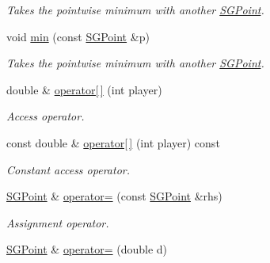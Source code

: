 \begin{DoxyCompactItemize}
\begin{DoxyCompactList}\small\item\em Takes the pointwise minimum with another \hyperlink{classSGPoint}{S\-G\-Point}. \end{DoxyCompactList}\item 
\hypertarget{classSGPoint_a06309da77645ba91101f4dedd20bd888}{void \hyperlink{classSGPoint_a06309da77645ba91101f4dedd20bd888}{min} (const \hyperlink{classSGPoint}{S\-G\-Point} \&p)}\label{classSGPoint_a06309da77645ba91101f4dedd20bd888}

\begin{DoxyCompactList}\small\item\em Takes the pointwise minimum with another \hyperlink{classSGPoint}{S\-G\-Point}. \end{DoxyCompactList}\item 
\hypertarget{classSGPoint_a640f67ad5fa6d0b5814b7c9aecd259d3}{double \& \hyperlink{classSGPoint_a640f67ad5fa6d0b5814b7c9aecd259d3}{operator\mbox{[}$\,$\mbox{]}} (int player)}\label{classSGPoint_a640f67ad5fa6d0b5814b7c9aecd259d3}

\begin{DoxyCompactList}\small\item\em Access operator. \end{DoxyCompactList}\item 
\hypertarget{classSGPoint_a23c4b005c8bc8968a806ee0458f94f9a}{const double \& \hyperlink{classSGPoint_a23c4b005c8bc8968a806ee0458f94f9a}{operator\mbox{[}$\,$\mbox{]}} (int player) const }\label{classSGPoint_a23c4b005c8bc8968a806ee0458f94f9a}

\begin{DoxyCompactList}\small\item\em Constant access operator. \end{DoxyCompactList}\item 
\hypertarget{classSGPoint_aedf45913c65b31cf7363f428cbe17087}{\hyperlink{classSGPoint}{S\-G\-Point} \& \hyperlink{classSGPoint_aedf45913c65b31cf7363f428cbe17087}{operator=} (const \hyperlink{classSGPoint}{S\-G\-Point} \&rhs)}\label{classSGPoint_aedf45913c65b31cf7363f428cbe17087}

\begin{DoxyCompactList}\small\item\em Assignment operator. \end{DoxyCompactList}\item 
\hypertarget{classSGPoint_a1766a2ef73345b9017c214c7eeed6b7e}{\hyperlink{classSGPoint}{S\-G\-Point} \& \hyperlink{classSGPoint_a1766a2ef73345b9017c214c7eeed6b7e}{operator=} (double d)}\label{classSGPoint_a1766a2ef73345b9017c214c7eeed6b7e}


\end{DoxyCompactItemize}
